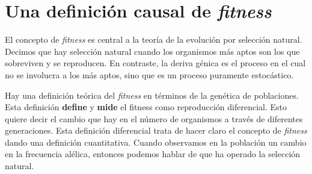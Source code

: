 
\chapter{Una definición causal de \emph{fitness}}


\noindent El concepto de \emph{fitness} es central a la teoría de la evolución por selección natural. Decimos que hay selección
natural cuando los organismos más aptos son los que sobreviven y se reproducen. 
En contraste, la deriva génica es el proceso en el cual no se involucra a los más aptos, sino que es un proceso puramente estocástico.

Hay una definición teórica del \emph{fitness} en términos de la genética de poblaciones. Esta definición \textbf{define}
y \textbf{mide} el fitness como reproducción diferencial. Esto quiere decir el cambio que hay en el número de organismos a través
de diferentes generaciones. Esta definición diferencial
trata de hacer claro el concepto de \emph{fitness} dando una definición cuantitativa. Cuando observamos en la población un cambio en la frecuencia alélica, entonces podemos hablar de que ha operado la selección natural.

